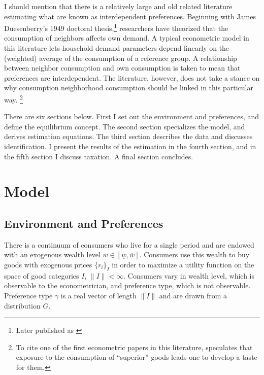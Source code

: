 \documentclass{article}
\begin{document}
I should mention that there is a relatively large and old related literature estimating what are known as interdependent preferences.  Beginning with James Duesenberry's 1949 doctoral thesis,\footnote{Later published as \citep{Duesenberry1949}} researchers have theorized that the consumption of neighbors affects own demand.  A typical econometric model in this literature lets household demand parameters depend linearly on the (weighted) average of the consumption of a reference group. A relationship between neighbor consumption and own consumption is taken to mean that preferences are interdependent.  The literature, however, does not take a stance on why consumption neighborhood consumption should be linked in this particular way. \footnote{To cite one of the first econometric papers in this literature, \citet{Pollak1976} speculates that exposure to the consumption of ``superior'' goods leads one to develop a taste for them.}  

There are six sections below.  First I set out the environment and preferences, and define the equilibrium concept.  The second section specializes the model, and derives estimation equations.  The third section describes the data and discusses identification.  I present the results of the estimation in the fourth section, and in the fifth section I discuss taxation.  A final section concludes. 

\section{Model}
\subsection{Environment and Preferences}
There is a continuum of consumers who live for a single period and are endowed with an exogenous wealth level $w \in \left[ \underline{w},\overline{w} \right]$.
Consumers use this wealth to buy goods with exogenous prices $\{r_i\}_I$ in order to maximize a utility function on the space of good categories $I$, $\|I\|<\infty$. 
Consumers vary in wealth level, which is observable to the econometrician, and preference type, which is not observable.
Preference type $\gamma$ is a real vector of length $\|I\|$ and are drawn from a distribution $G$.
\end{document}
